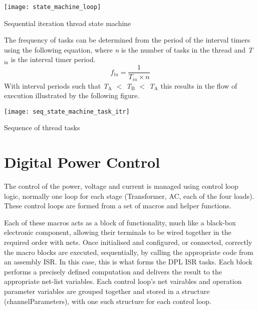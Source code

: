\begin{DoxyImage}
\texttt{[image: state\_machine\_loop]}
\caption{Sequential iteration thread state machine}
\end{DoxyImage}


The frequency of tasks can be determined from the period of the interval timers using the following equation, where {\itshape n} is the number of tasks in the thread and {\itshape T$_{\mbox{in}}$ } is the interval timer period. \[ f_{ta}= \frac{1}{T_{in} \times n} \] With interval periods such that {\itshape T$_{\mbox{A}}$ } {\ttfamily $<$} {\itshape T$_{\mbox{B}}$ } {\ttfamily $<$} {\itshape T$_{\mbox{A}}$ } this results in the flow of execution illustrated by the following figure.


\begin{DoxyImage}
\texttt{[image: seq\_state\_machine\_task\_itr]}
\caption{Sequence of thread tasks}
\end{DoxyImage}
\hypertarget{index_dpctrl}{}\section{Digital Power Control}\label{index_dpctrl}
The control of the power, voltage and current is managed using control loop logic, normally one loop for each stage (Transformer, A\-C, each of the four loads). These control loops are formed from a set of macros and helper functions.

Each of these macros acts as a block of functionality, much like a black-\/box electronic component, allowing their terminals to be wired together in the required order with nets. Once initialised and configured, or connected, correctly the macro blocks are executed, sequentially, by calling the appropriate code from an assembly I\-S\-R. In this case, this is what forms the D\-P\-L I\-S\-R tasks. Each block performs a precisely defined computation and delivers the result to the appropriate net-\/list variables. Each control loop's net vairables and operation parameter variables are grouped together and stored in a structure (channel\-Parameters), with one such structure for each control loop.

